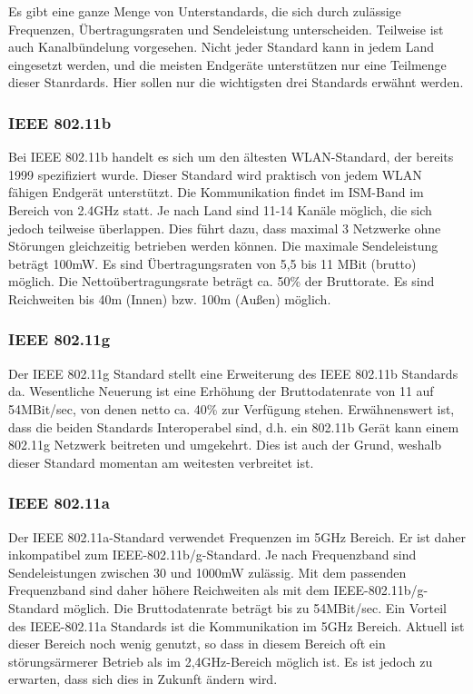 Es gibt eine ganze Menge von Unterstandards, die sich durch zulässige Frequenzen, 
Übertragungsraten und Sendeleistung unterscheiden. Teilweise ist auch Kanalbündelung 
vorgesehen. Nicht jeder Standard kann in jedem Land eingesetzt werden, und die meisten
Endgeräte unterstützen nur eine Teilmenge dieser Stanrdards. Hier sollen nur die
wichtigsten drei Standards erwähnt werden.

\subsubsection{IEEE 802.11b}
Bei IEEE 802.11b handelt es sich um den ältesten WLAN-Standard, der bereits 1999 
spezifiziert wurde. Dieser Standard wird praktisch von jedem WLAN fähigen 
Endgerät unterstützt. Die Kommunikation findet im ISM-Band im Bereich von 2.4GHz
statt. Je nach Land sind 11-14 Kanäle möglich, die sich jedoch teilweise überlappen.
Dies führt dazu, dass maximal 3 Netzwerke ohne Störungen gleichzeitig betrieben werden
können. Die maximale Sendeleistung beträgt 100mW. Es sind Übertragungsraten von 
5,5 bis 11 MBit (brutto) möglich. Die Nettoübertragungsrate beträgt ca. 50\% der
Bruttorate. Es sind Reichweiten bis 40m (Innen) bzw. 100m (Außen) möglich\cite{WirelessNetworking}.

\subsubsection{IEEE 802.11g}
Der IEEE 802.11g Standard stellt eine Erweiterung des IEEE 802.11b Standards da.
Wesentliche Neuerung ist eine Erhöhung der Bruttodatenrate von 11 auf 54MBit/sec,
von denen netto ca. 40\% zur Verfügung stehen. Erwähnenswert ist, dass die
beiden Standards Interoperabel sind, d.h. ein 802.11b Gerät kann einem
802.11g Netzwerk beitreten und umgekehrt. Dies ist auch der Grund, weshalb
dieser Standard momentan am weitesten verbreitet ist.

\subsubsection{IEEE 802.11a}
Der IEEE 802.11a-Standard verwendet Frequenzen im 5GHz Bereich. Er ist daher
inkompatibel zum IEEE-802.11b/g-Standard. Je nach Frequenzband sind 
Sendeleistungen zwischen 30 und 1000mW zulässig. Mit dem passenden Frequenzband
sind daher höhere Reichweiten als mit dem IEEE-802.11b/g-Standard möglich.
Die Bruttodatenrate beträgt bis zu 54MBit/sec. 
Ein Vorteil des IEEE-802.11a Standards ist die Kommunikation im 5GHz Bereich.
Aktuell ist dieser Bereich noch wenig genutzt, so dass in diesem
Bereich oft ein störungsärmerer Betrieb als im 2,4GHz-Bereich möglich ist.
Es ist jedoch zu erwarten, dass sich dies in Zukunft ändern wird.

